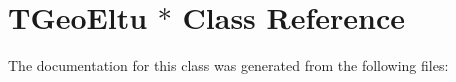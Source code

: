 \hypertarget{class_t_geo_eltu_01_5}{}\section{T\+Geo\+Eltu $\ast$ Class Reference}
\label{class_t_geo_eltu_01_5}


The documentation for this class was generated from the following files\+: